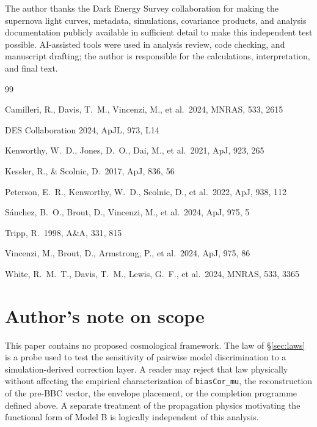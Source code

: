 \documentclass[11pt]{article}
\begin{document}
The author thanks the Dark Energy Survey collaboration for making the
supernova light curves, metadata, simulations, covariance products, and
analysis documentation publicly available in sufficient detail to make
this independent test possible. AI-assisted tools were used in analysis
review, code checking, and manuscript drafting; the author is responsible
for the calculations, interpretation, and final text.

\begin{thebibliography}{99}

Camilleri, R., Davis, T.~M., Vincenzi, M., et al.\ 2024, MNRAS, 533, 2615

DES Collaboration 2024, ApJL, 973, L14

Kenworthy, W.~D., Jones, D.~O., Dai, M., et al.\ 2021, ApJ, 923, 265

Kessler, R., \& Scolnic, D.\ 2017, ApJ, 836, 56

Peterson, E.~R., Kenworthy, W.~D., Scolnic, D., et al.\ 2022, ApJ, 938, 112

S\'anchez, B.~O., Brout, D., Vincenzi, M., et al.\ 2024, ApJ, 975, 5

Tripp, R.\ 1998, A\&A, 331, 815

Vincenzi, M., Brout, D., Armstrong, P., et al.\ 2024, ApJ, 975, 86

White, R.~M.~T., Davis, T.~M., Lewis, G.~F., et al.\ 2024, MNRAS, 533, 3365

\end{thebibliography}

\section*{Author's note on scope}

This paper contains no proposed cosmological framework. The law of
\S\ref{sec:laws} is a probe used to test the sensitivity of pairwise model
discrimination to a simulation-derived correction layer. A reader may
reject that law physically without affecting the empirical
characterization of \texttt{biasCor\_mu}, the reconstruction of the
pre-BBC vector, the envelope placement, or the completion programme
defined above. A separate treatment of the propagation physics motivating
the functional form of Model B is logically independent of this analysis.
\end{document}
